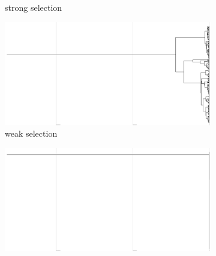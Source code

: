 \begin{figure}
\begin{subfigure}[b]{0.5\columnwidth}
    \caption{%
      strong selection}
  \end{subfigure}
  \hfill
  \begin{subfigure}[b]{0.5\columnwidth}
    \includegraphics[height=0.12\textheight,width=\textwidth]{img/perfect-tree-phylogenies-log/epoch=7+resolution=3+treatment=14/a=collapsed-phylogeny+epoch=00007+mut_distn=np.random.standard_normal+num_generations=32768+num_islands=1+num_niches=1+p_island_migration=0.01+p_niche_invasion=3.0517578125e-08+population_size=32768+r.../eplicate=0+tournament_size=1+treatment=14+_generation=262144+_index=14+scale=nonlog+ext=.pdf}
    \caption{%
      weak selection}
  \end{subfigure}
  \hfill
  \begin{subfigure}[b]{0.5\columnwidth}
    \centering
    \includegraphics[height=0.12\textheight,width=\textwidth]{img/perfect-tree-phylogenies-log/epoch=7+resolution=3+treatment=8/a=collapsed-phylogeny+epoch=00007+mut_distn=np.random.standard_normal+num_generations=32768+num_islands=1+num_niches=1+p_island_migration=0.01+p_niche_invasion=3.0517578125e-08+population_size=32768+r.../eplicate=0+tournament_size=2+treatment=8+_generation=262144+_index=8+scale=nonlog+ext=.pdf}

\end{subfigure}
\end{figure}
